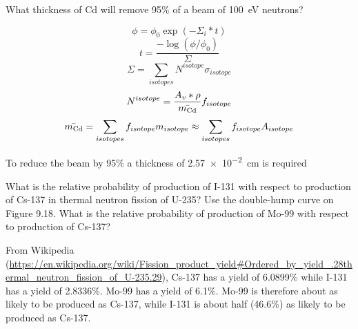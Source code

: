 \documentclass{hw}
\begin{document}
What thickness of Cd will remove 95\% of a beam of \SI{100}{\electronvolt} neutrons?

\solution
$$ \phi = \phi_0 \exp{\left(-\Sigma_i * t\right)} $$
$$ t = \frac{-\log \left(\phi / \phi_0 \right) }{\Sigma} $$
$$ \Sigma = \sum_{isotopes} N^{isotope} \sigma_{isotope} $$
$$ N^{isotope} = \frac{A_v * \rho}{\bar{m_{\ce{Cd}}}} f_{isotope} $$
$$ \bar{m_{\ce{Cd}}} = \sum_{isotopes} f_{isotope} m_{isotope} \approx \sum_{isotopes} f_{isotope} A_{isotope} $$

To reduce the beam by 95\% a thickness of \SI{2.57e-2}{\centi\meter} is required

\problem{}
What is the relative probability of production of I-131 with respect to production of Cs-137 in thermal neutron fission of U-235? Use the double-hump curve on Figure 9.18. What is the relative probability of production of Mo-99 with respect to production of Cs-137?

\solution
From Wikipedia (\url{https://en.wikipedia.org/wiki/Fission_product_yield#Ordered_by_yield_.28thermal_neutron_fission_of_U-235.29}), Cs-137 has a yield of 6.0899\% while I-131 has a yield of 2.8336\%. Mo-99 has a yield of 6.1\%. Mo-99 is therefore about as likely to be produced as Cs-137, while I-131 is about half (46.6\%) as likely to be produced as Cs-137.
\end{document}
